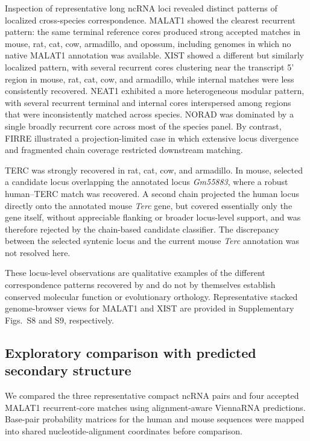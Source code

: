 Inspection of representative long ncRNA loci revealed distinct patterns of
localized cross-species correspondence. MALAT1 showed the clearest recurrent
pattern: the same terminal reference cores produced strong accepted matches in
mouse, rat, cat, cow, armadillo, and opossum, including genomes in which no native
MALAT1 annotation was available. XIST showed a different but similarly localized
pattern, with several recurrent cores clustering near the transcript 5' region
in mouse, rat, cat, cow, and armadillo, while internal matches were less
consistently recovered. NEAT1 exhibited a more heterogeneous modular pattern,
with several recurrent terminal and internal cores interspersed among regions
that were inconsistently matched across species. NORAD was dominated by a single
broadly recurrent core across most of the species panel. By contrast, FIRRE
illustrated a projection-limited case in which extensive locus divergence and
fragmented chain coverage restricted downstream matching.

TERC was strongly recovered in rat, cat, cow, and armadillo. In mouse, \curia{}
selected a candidate locus overlapping the annotated locus \textit{Gm55883},
where a robust human--TERC match was recovered. A second chain projected the
human locus directly onto the annotated mouse \textit{Terc} gene, but covered
essentially only the gene itself, without appreciable flanking or broader
locus-level support, and was therefore rejected by the chain-based candidate
classifier. The discrepancy between the selected syntenic locus and the current
mouse \textit{Terc} annotation was not resolved here.

These locus-level observations are qualitative examples of the different
correspondence patterns recovered by \curia{} and do not by themselves establish
conserved molecular function or evolutionary orthology.
Representative stacked genome-browser views for MALAT1 and XIST are provided in
Supplementary Figs.~S8 and S9, respectively.

\subsection{Exploratory comparison with predicted secondary structure}

We compared the three representative compact ncRNA pairs and four accepted
MALAT1 recurrent-core matches using alignment-aware ViennaRNA predictions.
Base-pair probability matrices for the human and mouse sequences were mapped into
shared nucleotide-alignment coordinates before comparison.

